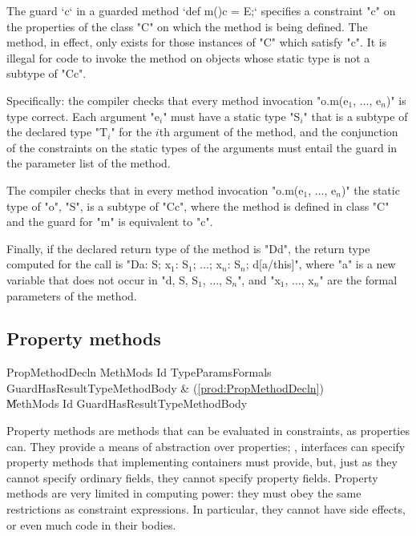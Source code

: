 The guard \xcd`{c}` 
in a guarded method 
\xcd`def m(){c} = E;`
specifies a constraint \xcd"c" on the
properties of the class \xcd"C" on which the method is being defined. The
method, in effect, only exists  for those instances of \xcd"C" which satisfy
\xcd"c".  It is 
illegal for code to invoke the method on objects whose static type is
not a subtype of \xcd"C{c}".

Specifically: 
    the compiler checks that every method invocation
    \xcdmath"o.m(e$_1$, $\dots$, e$_n$)"
    is type correct. Each argument
    \xcdmath"e$_i$" must have a
    static type \xcdmath"S$_i$" that is a subtype of the declared type
    \xcdmath"T$_i$" for the $i$th
    argument of the method, and the conjunction of the constraints on the
    static types 
    of the arguments must entail the guard in the parameter list
    of the method.

    The compiler checks that in every method invocation
    \xcdmath"o.m(e$_1$, $\dots$, e$_n$)"
    the static type of \xcd"o", \xcd"S", is a subtype of \xcd"C{c}", where the method
    is defined in class \xcd"C" and the guard for \xcd"m" is equivalent to
    \xcd"c".

    Finally, if the declared return type of the method is
    \xcd"D{d}", the
    return type computed for the call is
    \xcdmath"D{a: S; x$_1$: S$_1$; $\dots$; x$_n$: S$_n$; d[a/this]}",
    where \xcd"a" is a new
    variable that does not occur in
    \xcdmath"d, S, S$_1$, $\dots$, S$_n$", and
    \xcdmath"x$_1$, $\dots$, x$_n$" are the formal
    parameters of the method.




\subsection{Property methods}

\begin{bbgrammar}
     PropMethodDecln \: MethMods Id TypeParams\opt Formals Guard\opt HasResultType\opt MethodBody & (\ref{prod:PropMethodDecln}) \\
                     \| MethMods Id Guard\opt HasResultType\opt MethodBody \\
\end{bbgrammar}

Property methods are methods that can be evaluated in constraints, as
properties can.   They provide a means of abstraction over properties; \eg,
interfaces can specify property methods that implementing containers must
provide, but, just as they cannot specify ordinary fields, they cannot specify
property fields.   Property methods are very limited in computing power: they
must obey the same restrictions as constraint expressions.  In particular,
they cannot have side effects, or even much code in their bodies.


